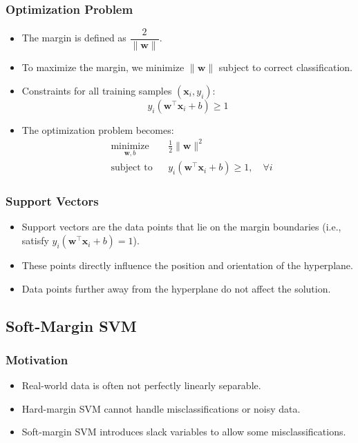 \documentclass{article}
\begin{document}
\subsubsection{Optimization Problem}

\begin{itemize}
    \item The margin is defined as $\dfrac{2}{\|\mathbf{w}\|}$.
    \item To maximize the margin, we minimize $\|\mathbf{w}\|$ subject to correct classification.
    \item Constraints for all training samples $(\mathbf{x}_i, y_i)$:
    \[
    y_i (\mathbf{w}^\top \mathbf{x}_i + b) \geq 1
    \]
    \item The optimization problem becomes:
    \[
    \begin{aligned}
    & \underset{\mathbf{w}, b}{\text{minimize}} && \frac{1}{2} \|\mathbf{w}\|^2 \\
    & \text{subject to} && y_i (\mathbf{w}^\top \mathbf{x}_i + b) \geq 1, \quad \forall i
    \end{aligned}
    \]
\end{itemize}

\subsubsection{Support Vectors}

\begin{itemize}
    \item Support vectors are the data points that lie on the margin boundaries (i.e., satisfy $y_i (\mathbf{w}^\top \mathbf{x}_i + b) = 1$).
    \item These points directly influence the position and orientation of the hyperplane.
    \item Data points further away from the hyperplane do not affect the solution.
\end{itemize}

\subsection{Soft-Margin SVM}

\subsubsection{Motivation}

\begin{itemize}
    \item Real-world data is often not perfectly linearly separable.
    \item Hard-margin SVM cannot handle misclassifications or noisy data.
    \item Soft-margin SVM introduces slack variables to allow some misclassifications.
\end{itemize}
\end{document}
